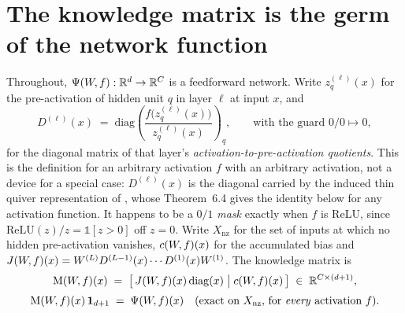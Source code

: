 
\section{The knowledge matrix is the germ of the network function}
\label{sec:germ}

Throughout, $\Psi(W\!,f):\mathbb{R}^d\to\mathbb{R}^C$ is a feedforward network. Write $z^{(\ell)}_q(x)$
for the pre-activation of hidden unit $q$ in layer $\ell$ at input $x$, and
\begin{equation}
D^{(\ell)}(x)\;=\;\mathrm{diag}\!\left(\frac{f\bigl(z^{(\ell)}_q(x)\bigr)}{z^{(\ell)}_q(x)}\right)_{\!q},
\qquad\text{with the guard } 0/0\mapsto0,
\label{eq:D-def}
\end{equation}
for the diagonal matrix of that layer's \emph{activation-to-pre-activation
quotients}. This is the definition for an arbitrary activation $f$ with
an arbitrary activation, not a device for a special case: $D^{(\ell)}(x)$ is the
diagonal carried by the induced thin quiver representation of
\citet{armenta2021representation}, whose Theorem~6.4 gives the identity below
for any activation function. It happens to be a $0/1$ \emph{mask} exactly when
$f$ is ReLU, since $\mathrm{ReLU}(z)/z=\mathbb 1[z>0]$ off $z=0$.
Write $X_{\mathrm{nz}}$ for the set of inputs at which no hidden
pre-activation vanishes, $c(W\!,f)(x)$ for the accumulated bias and
$J(W\!,f)(x)=W^{(L)}D^{(L-1)}(x)\cdots D^{(1)}(x)W^{(1)}$.
The knowledge matrix is
\begin{equation}
\begin{gathered}
\mathrm{M}(W\!,f)(x)\;=\;\bigl[\,J(W\!,f)(x)\,\mathrm{diag}(x)\;\big|\;c(W\!,f)(x)\,\bigr]
\;\in\;\mathbb{R}^{C\times(d+1)},\\[3pt]
\mathrm{M}(W\!,f)(x)\,\mathbf 1_{d+1}\;=\;\Psi(W\!,f)(x)
\quad\text{(exact on $X_{\mathrm{nz}}$, for \emph{every} activation $f$)} .
\end{gathered}
\label{eq:km-def}
\end{equation}

